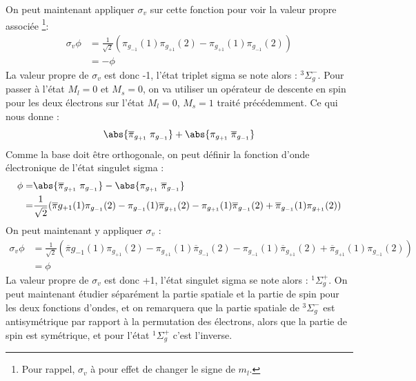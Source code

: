 On peut maintenant appliquer $\sigma_v$ sur cette fonction pour voir la valeur propre associée \footnote{Pour rappel, $\sigma_v$ à pour effet de changer le signe de $m_l$.}: 
\begin{equation*}
    \begin{split}
        \sigma_v\phi &= \frac{1}{\sqrt{2}}(\pi_{g_{-1}}(1)\pi_{g_{+1}}(2)-\pi_{g_{+1}}(1)\pi_{g_{-1}}(2))\\
        &= -\phi
    \end{split}
\end{equation*}
La valeur propre de $\sigma_v$ est donc -1, l'état triplet sigma se note alors : $^3\Sigma_g^-$.\newline
Pour passer à l'état $M_l = 0$ et $M_s = 0$, on va utiliser un opérateur de descente en spin pour les deux électrons sur l'état $M_l = 0$, $M_s = 1$ traité précédemment. Ce qui nous donne : 
\begin{equation*}
    \abs{\overline{\pi}_{g_{+1}}\;\pi_{g_{-1}}} + \abs{\pi_{g_{+1}}\;\overline{\pi}_{g_{-1}}}
\end{equation*}
Comme la base doit être orthogonale, on peut définir la fonction d'onde électronique de l'état singulet sigma : 
\begin{equation*}
    \begin{split}
        \phi =& \abs{\overline{\pi}_{g_{+1}}\;\pi_{g_{-1}}} - \abs{\pi_{g_{+1}}\;\overline{\pi}_{g_{-1}}}\\
        =& \frac{1}{\sqrt{2}}(\overline{\pi}{g_{+1}}(1)\pi_{g_{-1}}(2) - \pi_{g_{-1}}(1)\overline{\pi}_{g_{+1}}(2) - \pi_{g_{+1}}(1)\overline{\pi}_{g_{-1}}(2) + \overline{\pi}_{g_{-1}}(1)\pi_{g_{+1}}(2))
    \end{split}
\end{equation*}
On peut maintenant y appliquer $\sigma_v$ : 
\begin{equation*}
    \begin{split}
        \sigma_v\phi &= \frac{1}{\sqrt{2}}(\overline{\pi}{g_{-1}}(1)\pi_{g_{+1}}(2) - \pi_{g_{+1}}(1)\overline{\pi}_{g_{-1}}(2) - \pi_{g_{-1}}(1)\overline{\pi}_{g_{+1}}(2) + \overline{\pi}_{g_{+1}}(1)\pi_{g_{-1}}(2))\\
        &= \phi
    \end{split}
\end{equation*}
La valeur propre de $\sigma_v$ est donc +1, l'état singulet sigma se note alors : $^1\Sigma_g^+$.\newline
On peut maintenant étudier séparément la partie spatiale et la partie de spin pour les deux fonctions d'ondes, et on remarquera que la partie spatiale de $^3\Sigma_g^-$ est antisymétrique par rapport à la permutation des électrons, alors que la partie de spin est symétrique, et pour l'état $^1\Sigma^+_g$ c'est l'inverse.\newline
